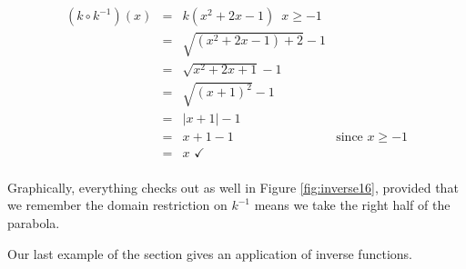 {\begin{enumerate}
\[\begin{array}{rclr}
\left(k \circ k^{-1} \right)(x) & = & k\left( x^2+2x-1 \right) \, \, \, x \geq -1 & \\ 

& = & \sqrt{\left(x^2+2x-1\right)+2}-1 & \\

& = & \sqrt{x^2+2x+1}-1 & \\

& = & \sqrt{(x+1)^2}-1 & \\

& = & |x+1| -1 & \\

& = & x+1 -1 & \mbox{since $x \geq -1$}\\

& = & x \, \, \checkmark &\\

\end{array}\]

Graphically, everything checks out as well in Figure \ref{fig:inverse16}, provided that we remember the domain restriction on $k^{-1}$ means we take the right half of the parabola.


\end{enumerate}
}

\medskip

Our last example of the section gives an application of inverse functions.  

\medskip


